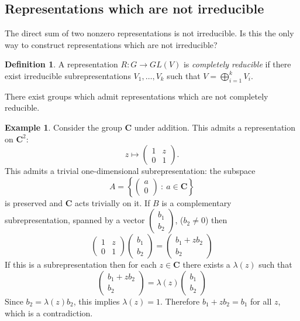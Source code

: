 \documentclass[12pt]{article}
\newcommand{\CC}{\mathbf{C}}
\theoremstyle{definition}
\newtheorem{dfn}[thm]{Definition}
\newtheorem{exm}[thm]{Example}
\theoremstyle{check}
\theoremstyle{remark}
\theoremstyle{TheoremNum}
\begin{document}
\subsection{Representations which are not irreducible}

The direct sum of two nonzero representations is not irreducible. Is this the only way to construct representations which are not irreducible?

\begin{dfn}
A representation $R\colon G\to GL(V)$ is {\em completely reducible} if there exist irreducible subrepresentations $V_1,\ldots,V_k$ such that $V=\bigoplus_{i=1}^kV_i$.
\end{dfn}

There exist groups which admit representations which are not completely reducible.
\begin{exm}
Consider the group $\CC$ under addition. This admits a representation on $\CC^2$:
\[z\mapsto\left(\begin{array}{cc}
1 & z\\
0 & 1
\end{array}\right).\]
This admits a trivial one-dimensional subrepresentation: the subspace
\[A=\left\{\left(\begin{array}{c}a\\ 0\end{array}\right)\ :\ a\in\CC\right\}\]
is preserved and $\CC$ acts trivially on it. If $B$ is a complementary subrepresentation, spanned by a vector $\left(\begin{array}{c} b_1\\ b_2\end{array}\right)$, ($b_2\neq 0$) then
\[\left(\begin{array}{cc}
1 & z\\
0 & 1
\end{array}\right)\left(\begin{array}{c} b_1\\ b_2\end{array}\right)=\left(\begin{array}{c} b_1+zb_2\\ b_2\end{array}\right)\]
If this is a subrepresentation then for each $z\in\CC$ there exists a $\lambda(z)$ such that
\[\left(\begin{array}{c} b_1+zb_2\\ b_2\end{array}\right)=\lambda(z)\left(\begin{array}{c} b_1\\ b_2\end{array}\right)\]
Since $b_2=\lambda(z)b_2$, this implies $\lambda(z)=1$. Therefore $b_1+zb_2=b_1$ for all $z$, which is a contradiction.
\end{exm}
\end{document}
